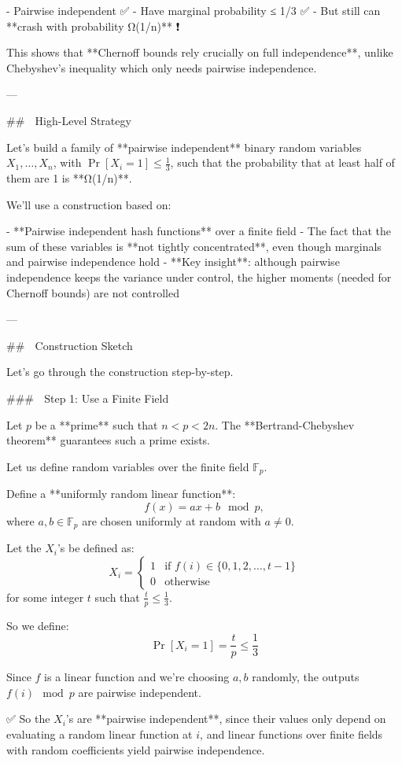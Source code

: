 - Pairwise independent ✅  
- Have marginal probability ≤ 1/3 ✅  
- But still can **crash with probability Ω(1/n)** ❗

This shows that **Chernoff bounds rely crucially on full independence**, unlike Chebyshev's inequality which only needs pairwise independence.

---

## 🚧 High-Level Strategy

Let's build a family of **pairwise independent** binary random variables \( X_1, \dots, X_n \), with \( \Pr[X_i = 1] \le \frac{1}{3} \), such that the probability that at least half of them are 1 is **Ω(1/n)**.

We'll use a construction based on:

- **Pairwise independent hash functions** over a finite field
- The fact that the sum of these variables is **not tightly concentrated**, even though marginals and pairwise independence hold
- **Key insight**: although pairwise independence keeps the variance under control, the higher moments (needed for Chernoff bounds) are not controlled

---

## 🧠 Construction Sketch

Let's go through the construction step-by-step.

### 🔢 Step 1: Use a Finite Field

Let \( p \) be a **prime** such that \( n < p < 2n \). The **Bertrand-Chebyshev theorem** guarantees such a prime exists.

Let us define random variables over the finite field \( \mathbb{F}_p \).

Define a **uniformly random linear function**:
\[
f(x) = ax + b \mod p,
\]
where \( a, b \in \mathbb{F}_p \) are chosen uniformly at random with \( a \ne 0 \).

Let the \( X_i \)'s be defined as:
\[
X_i = \begin{cases}
1 & \text{if } f(i) \in \{0, 1, 2, \dots, t-1\} \\
0 & \text{otherwise}
\end{cases}
\]
for some integer \( t \) such that \( \frac{t}{p} \le \frac{1}{3} \).

So we define:
\[
\Pr[X_i = 1] = \frac{t}{p} \le \frac{1}{3}
\]

Since \( f \) is a linear function and we're choosing \( a, b \) randomly, the outputs \( f(i) \mod p \) are pairwise independent.

✅ So the \( X_i \)'s are **pairwise independent**, since their values only depend on evaluating a random linear function at \( i \), and linear functions over finite fields with random coefficients yield pairwise independence.

